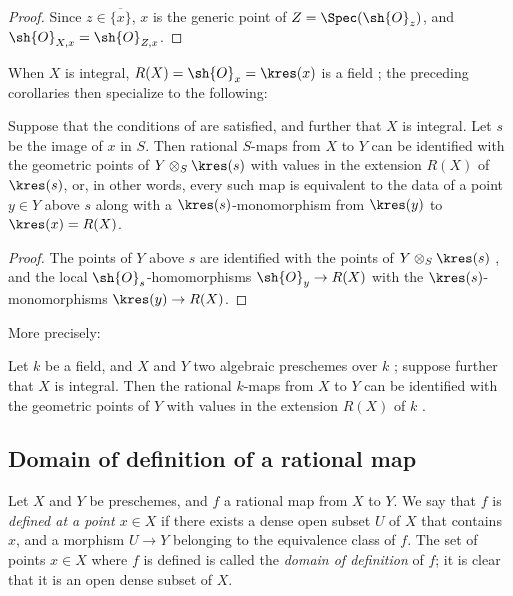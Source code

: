 \begin{proof}
Since $z\in\overline{\{x\}}$, $x$ is the generic point of $Z=\Spec(\sh{O}_z)$, and $\sh{O}_{X,x}=\sh{O}_{Z,x}$.
\end{proof}

When $X$ is integral, $R(X)=\sh{O}_x=\kres(x)$ is a field ; the preceding corollaries then specialize to the following:
\begin{corollary}[7.1.15]
\label{I.7.1.15}
Suppose that the conditions of  are satisfied, and further that $X$ is integral.
Let $s$ be the image of $x$ in $S$.
Then rational $S$-maps from $X$ to $Y$ can be identified with the geometric points of $Y\otimes_S\kres(s)$ with values in the extension $R(X)$ of $\kres(s)$, or, in other words, every such map is equivalent to the data of a point $y\in Y$ above $s$ along with a $\kres(s)$-monomorphism from $\kres(y)$ to $\kres(x)=R(X)$.
\end{corollary}

\begin{proof}
The points of $Y$ above $s$ are identified with the points of $Y\otimes_S\kres(s)$ , and the local $\sh{O}_s$-homomorphisms $\sh{O}_y\to R(X)$ with the $\kres(s)$-monomorphisms $\kres(y)\to R(X)$.
\end{proof}

More precisely:
\begin{corollary}[7.1.16]
\label{I.7.1.16}
Let $k$ be a field, and $X$ and $Y$ two algebraic preschemes over $k$ ; suppose further that $X$ is integral.
Then the rational $k$-maps from $X$ to $Y$ can be identified with the geometric points of $Y$ with values in the extension $R(X)$ of $k$ .
\end{corollary}

\subsection{Domain of definition of a rational map}
\label{subsection:I.7.2}
\label{I.7.2}

\begin{env}[7.2.1]
\label{I.7.2.1}
Let $X$ and $Y$ be preschemes, and $f$ a rational map from $X$ to $Y$.
We say that $f$ is \emph{defined at a point $x\in X$} if there exists a dense open subset $U$ of $X$ that contains $x$, and a morphism $U\to Y$ belonging to the equivalence class of $f$.
The set of points $x\in X$ where $f$ is defined is called the \emph{domain of definition} of $f$; it is clear that it is an open dense subset of $X$.
\end{env}

